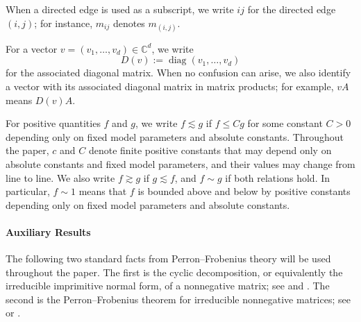 \documentclass[11pt,twoside, a4paper]{article}
\numberwithin{equation}{section}
\numberwithin{figure}{section}
\theoremstyle{plain} %
\theoremstyle{definition}
\theoremstyle{remark}
\newcommand{\1} {\mspace{1 mu}}
\newcommand{\2} {\mspace{2 mu}}
\newcommand{\C} {{\mathbb{C}}}
\begin{document}
When a directed edge is used as a subscript, we write \(ij\) for the directed edge \((i,j)\); for instance, \(m_{ij}\) denotes \(m_{(i,j)}\).

For a vector $v=(v_1,\dots,v_d)\in\C^d$, we write
\[
D(v):=\operatorname{diag}(v_1,\dots,v_d)
\]
for the associated diagonal matrix. When no confusion can arise, we also identify a vector with its associated diagonal matrix in matrix products; for example, $vA$ means $D(v)A$.

For positive quantities $f$ and $g$, we write $f\lesssim g$ if $f\le Cg$ for some constant $C>0$ depending only on fixed model parameters and absolute constants. 
Throughout the paper, $c$ and $C$ denote finite positive constants that may depend only on absolute constants and fixed model parameters, and their values may change from line to line.
We also write $f\gtrsim g$ if $g\lesssim f$, and $f\sim g$ if both relations hold. In particular, $f\sim 1$ means that $f$ is bounded above and below by positive constants depending only on fixed model parameters and absolute constants. 




\paragraph{Auxiliary Results}
The following two standard facts from Perron--Frobenius theory will be used throughout the paper. The first is the cyclic decomposition, or equivalently the irreducible imprimitive normal form, of a nonnegative matrix; see \cite[Chapter 3]{BrualdiRyser1991} and \cite[Chapter 2]{BermanPlemmons1994}. The second is the Perron--Frobenius theorem for irreducible nonnegative matrices; see \cite[Chapter 2]{BermanPlemmons1994} or \cite[Chapter 8]{HornJohnson2013}.
\end{document}

